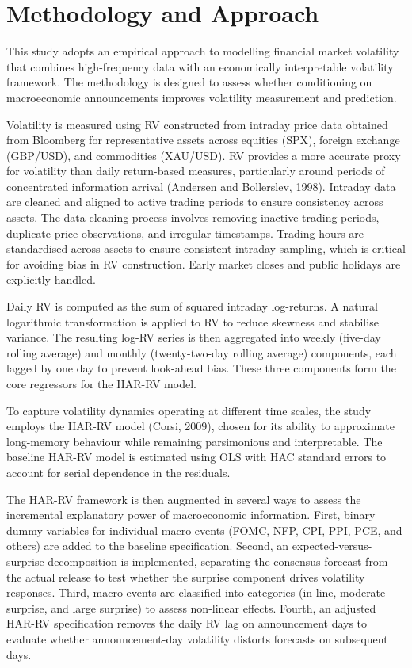 \documentclass[12pt,a4paper]{report}
\begin{document}
\section{Methodology and Approach}
This study adopts an empirical approach to modelling financial market volatility that combines high-frequency data with an economically interpretable volatility framework. The methodology is designed to assess whether conditioning on macroeconomic announcements improves volatility measurement and prediction.

Volatility is measured using RV constructed from intraday price data obtained from Bloomberg for representative assets across equities (SPX), foreign exchange (GBP/USD), and commodities (XAU/USD). RV provides a more accurate proxy for volatility than daily return-based measures, particularly around periods of concentrated information arrival (Andersen and Bollerslev, 1998). Intraday data are cleaned and aligned to active trading periods to ensure consistency across assets. The data cleaning process involves removing inactive trading periods, duplicate price observations, and irregular timestamps. Trading hours are standardised across assets to ensure consistent intraday sampling, which is critical for avoiding bias in RV construction. Early market closes and public holidays are explicitly handled.

Daily RV is computed as the sum of squared intraday log-returns. A natural logarithmic transformation is applied to RV to reduce skewness and stabilise variance. The resulting log-RV series is then aggregated into weekly (five-day rolling average) and monthly (twenty-two-day rolling average) components, each lagged by one day to prevent look-ahead bias. These three components form the core regressors for the HAR-RV model.

To capture volatility dynamics operating at different time scales, the study employs the HAR-RV model (Corsi, 2009), chosen for its ability to approximate long-memory behaviour while remaining parsimonious and interpretable. The baseline HAR-RV model is estimated using OLS with HAC standard errors to account for serial dependence in the residuals.

The HAR-RV framework is then augmented in several ways to assess the incremental explanatory power of macroeconomic information. First, binary dummy variables for individual macro events (FOMC, NFP, CPI, PPI, PCE, and others) are added to the baseline specification. Second, an expected-versus-surprise decomposition is implemented, separating the consensus forecast from the actual release to test whether the surprise component drives volatility responses. Third, macro events are classified into categories (in-line, moderate surprise, and large surprise) to assess non-linear effects. Fourth, an adjusted HAR-RV specification removes the daily RV lag on announcement days to evaluate whether announcement-day volatility distorts forecasts on subsequent days.
\end{document}
